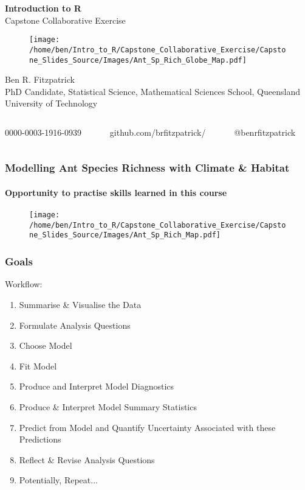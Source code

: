 \documentclass[xcolor=dvipsnames]{beamer}
\begin{document}
\begin{frame} %
\textbf{\huge Introduction to R}\\
Capstone Collaborative Exercise

\begin{figure}
\texttt{[image: /home/ben/Intro\_to\_R/Capstone\_Collaborative\_Exercise/Capstone\_Slides\_Source/Images/Ant\_Sp\_Rich\_Globe\_Map.pdf]}
\end{figure}
\small Ben R. Fitzpatrick\\
\tiny PhD Candidate, Statistical Science, Mathematical Sciences School, Queensland University of Technology
\newline
\begin{columns}
\begin{column}{3cm}
\tiny 0000-0003-1916-0939
\end{column}
\begin{column}{3cm}
\tiny github.com/brfitzpatrick/
\end{column}
\begin{column}{3cm}
\tiny @benrfitzpatrick
\end{column}
\end{columns}
\end{frame}

\begin{frame}
\frametitle{Modelling Ant Species Richness with Climate \& Habitat}
\framesubtitle{Opportunity to practise skills learned in this course}

\begin{figure}
\texttt{[image: /home/ben/Intro\_to\_R/Capstone\_Collaborative\_Exercise/Capstone\_Slides\_Source/Images/Ant\_Sp\_Rich\_Map.pdf]}
\end{figure}

\end{frame}

\begin{frame}
\frametitle{Goals}
Workflow:
\begin{enumerate}
\item Summarise \& Visualise the Data
\item Formulate Analysis Questions
\item Choose Model
\item Fit Model
\item Produce and Interpret Model Diagnostics
\item Produce \& Interpret Model Summary Statistics
\item Predict from Model and Quantify Uncertainty Associated with these Predictions
\item Reflect \& Revise Analysis Questions
\item Potentially, Repeat...
\end{enumerate}
\end{frame}
\end{document}
